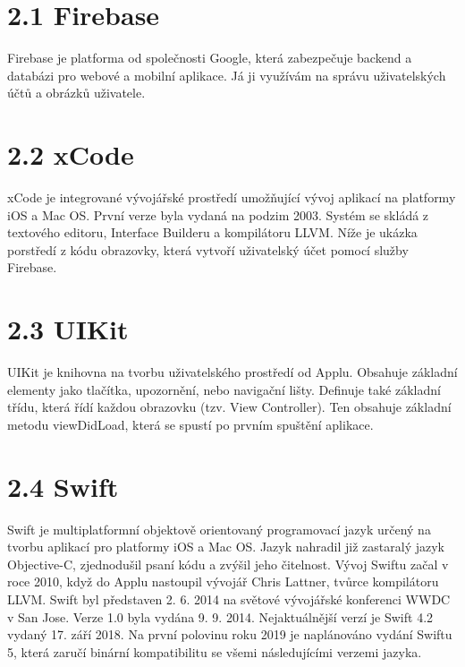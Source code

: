 \documentclass{article}
\begin{document}
\vspace{10 mm}

\section*{2.1 Firebase}
	Firebase je platforma od společnosti Google, která zabezpečuje backend a databázi pro webové a mobilní aplikace. Já ji využívám na správu uživatelských účtů a obrázků uživatele.



\vspace{10 mm}

\section*{2.2 xCode}
xCode je integrované vývojářské prostředí umožňující vývoj aplikací na platformy iOS a Mac OS. První verze byla vydaná na podzim 2003. Systém se skládá z textového 
editoru, Interface Builderu a kompilátoru LLVM. Níže je ukázka porstředí z kódu obrazovky, která vytvoří uživatelský účet pomocí služby Firebase.


\vspace{10 mm}
\section*{2.3 UIKit}
UIKit je knihovna na tvorbu uživatelského prostředí od Applu. Obsahuje základní elementy jako tlačítka, upozornění, nebo navigační lišty. Definuje také základní třídu, která řídí každou obrazovku (tzv. View Controller). Ten obsahuje základní metodu viewDidLoad, která se spustí po prvním spuštění aplikace.




\section*{2.4 Swift}
Swift je multiplatformní objektově orientovaný programovací jazyk určený na tvorbu aplikací pro platformy iOS a Mac OS. Jazyk nahradil již zastaralý jazyk Objective-C, zjednodušil psaní kódu a zvýšil jeho čitelnost. Vývoj Swiftu začal v roce 2010, když do Applu nastoupil vývojář Chris Lattner, tvůrce kompilátoru LLVM. 
Swift byl představen 2. 6. 2014 na světové vývojářské konferenci WWDC v San Jose. Verze 1.0 byla vydána 9. 9. 2014. Nejaktuálnější verzí je Swift 4.2 vydaný 17. září 2018. Na první polovinu roku 2019 je naplánováno vydání Swiftu 5, která zaručí binární kompatibilitu se všemi následujícími verzemi jazyka.
\vspace{10 mm}
\end{document}
